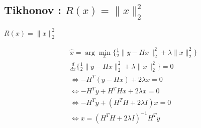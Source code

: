 \subsection{Tikhonov : $R(x) = \lVert x \rVert_{2}^{2}$}

\frame{
    \tableofcontents[ 
        currentsubsection, 
    ]
}

\begin{frame}{$R(x) = \lVert x \rVert_{2}^{2}$}

\begin{align*}
&\hat{x} = \arg\min\limits_{x} \{ 
    \frac{1}{2} \lVert y - Hx \rVert_{2}^{2} 
    + \lambda \lVert x \rVert_{2}^{2}
\} \\
&\frac{d}{dx} \{
    \frac{1}{2} \lVert y - Hx \rVert_{2}^{2} 
    + \lambda \lVert x \rVert_{2}^{2}
\} = 0 \\
&\iff - H^{T} (y - Hx) + 2\lambda x = 0 \\
&\iff - H^{T} y + H^{T}Hx + 2\lambda x = 0 \\
&\iff - H^{T} y + (H^{T}H + 2\lambda I) x = 0 \\
&\iff x = (H^{T}H + 2\lambda I)^{-1} H^{T} y \\
\end{align*}

\end{frame}